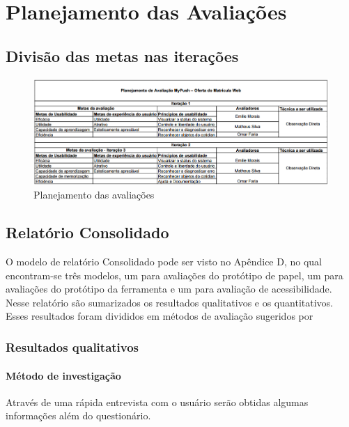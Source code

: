 \chapter{Planejamento das Avaliações}

\section{Divisão das metas nas iterações}
\begin{figure}[h!]
  \centering
    \includegraphics[keepaspectratio=true, scale=0.5]{figuras/planejamentoavaliacoes.png}
  \caption{Planejamento das avaliações}
\end{figure}

% 

\section{Relatório Consolidado}

O modelo de relatório Consolidado pode ser visto no Apêndice D, no qual encontram-se três modelos,
um para avaliações do protótipo de papel, um para avaliações do protótipo da ferramenta e um para avaliação de acessibilidade. Nesse relatório
são sumarizados os resultados qualitativos e os quantitativos. Esses resultados foram divididos em métodos
de avaliação sugeridos por \cite{BARBOSA}

\subsection{Resultados qualitativos}

\subsubsection{Método de investigação}
Através de uma rápida entrevista com o usuário serão obtidas algumas informações além do questionário.

